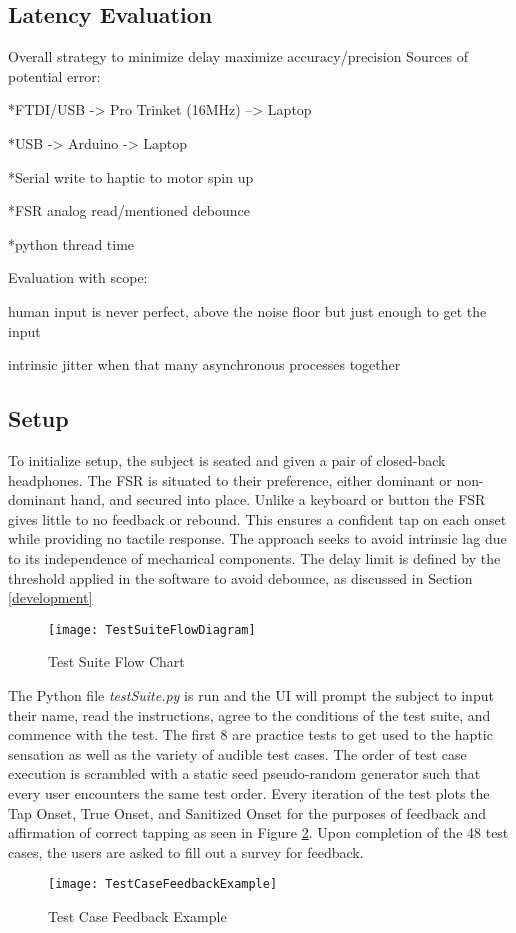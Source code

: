 \subsection{Latency Evaluation} \label{latencyCalc}
Overall strategy to minimize delay maximize accuracy/precision
Sources of potential error:

    *FTDI/USB -> Pro Trinket (16MHz) --> Laptop

    *USB -> Arduino -> Laptop

    *Serial write to haptic to motor spin up

    *FSR analog read/mentioned debounce

    *python thread time

    Evaluation with scope:

    human input is never perfect, above the noise floor but just enough to get the input

    intrinsic jitter when that many asynchronous processes together

\subsection{Setup} \label{testSetup}
To initialize setup, the subject is seated and given a pair of closed-back headphones. The FSR is situated to their preference, either dominant or non-dominant hand, and secured into place. Unlike a keyboard or button the FSR gives little to no feedback or rebound. This ensures a confident tap on each onset while providing no tactile response. The approach seeks to avoid intrinsic lag due to its independence of mechanical components. The delay limit is defined by the threshold applied in the software to avoid debounce, as discussed in Section \ref{development}

\begin{figure}[H]
    \centering
    \texttt{[image: TestSuiteFlowDiagram]}
    \caption{Test Suite Flow Chart}
    \label{fig:TestSuiteFlowDiagram}
\end{figure}

The Python file \textit{testSuite.py} is run and the UI will prompt the subject to input their name, read the instructions, agree to the conditions of the test suite, and commence with the test. The first 8 are practice tests to get used to the haptic sensation as well as the variety of audible test cases. The order of test case execution is scrambled with a static seed pseudo-random generator such that every user encounters the same test order. Every iteration of the test plots the Tap Onset, True Onset, and Sanitized Onset  for the purposes of feedback and affirmation of correct tapping as seen in Figure \ref{fig:TestCaseFeedbackEx}. Upon completion of the 48 test cases, the users are asked to fill out a survey for feedback.

\begin{figure}[]
    \centering
    \texttt{[image: TestCaseFeedbackExample]}
    \caption{Test Case Feedback Example}
    \label{fig:TestCaseFeedbackEx}
\end{figure}